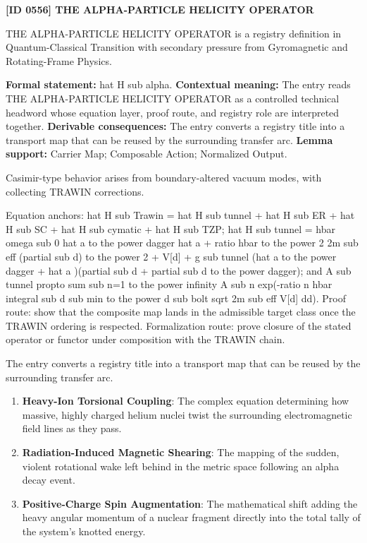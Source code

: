 \clearpage
\noindent\textbf{[ID 0556] THE ALPHA-PARTICLE HELICITY OPERATOR}\par
\vspace{0.35em}
\begingroup\small
{}
THE ALPHA-PARTICLE HELICITY OPERATOR is a registry definition in Quantum-Classical Transition with secondary pressure from Gyromagnetic and Rotating-Frame Physics.

\begingroup\footnotesize\setlength{\emergencystretch}{3em}\sloppy
\textbf{Formal statement:} hat H sub alpha. \textbf{Contextual meaning:} The entry reads THE ALPHA-PARTICLE HELICITY OPERATOR as a controlled technical headword whose equation layer, proof route, and registry role are interpreted together. \textbf{Derivable consequences:} The entry converts a registry title into a transport map that can be reused by the surrounding transfer arc. \textbf{Lemma support:} Carrier Map; Composable Action; Normalized Output.\par
\endgroup

Casimir-type behavior arises from boundary-altered vacuum modes, with collecting TRAWIN corrections.

Equation anchors: hat H sub Trawin = hat H sub tunnel + hat H sub ER + hat H sub SC + hat H sub cymatic + hat H sub TZP; hat H sub tunnel = hbar omega sub 0 hat a to the power dagger hat a + ratio hbar to the power 2 2m sub eff (partial sub d) to the power 2 + V[d] + g sub tunnel (hat a to the power dagger + hat a )(partial sub d + partial sub d to the power dagger); and A sub tunnel propto sum sub n=1 to the power infinity A sub n exp(-ratio n hbar integral sub d sub min to the power d sub bolt sqrt 2m sub eff V[d] dd). Proof route: show that the composite map lands in the admissible target class once the TRAWIN ordering is respected. Formalization route: prove closure of the stated operator or functor under composition with the TRAWIN chain.

The entry converts a registry title into a transport map that can be reused by the surrounding transfer arc.
\endgroup

\begin{enumerate}[leftmargin=1.6em,itemsep=6pt,topsep=4pt]
\item \textbf{Heavy-Ion Torsional Coupling}: The complex equation determining how massive, highly charged helium nuclei twist the surrounding electromagnetic field lines as they pass.
\item \textbf{Radiation-Induced Magnetic Shearing}: The mapping of the sudden, violent rotational wake left behind in the metric space following an alpha decay event.
\item \textbf{Positive-Charge Spin Augmentation}: The mathematical shift adding the heavy angular momentum of a nuclear fragment directly into the total tally of the system's knotted energy.
\end{enumerate}

